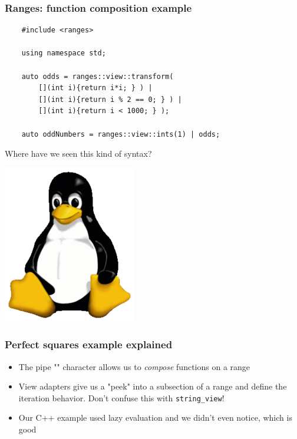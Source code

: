 \documentclass{beamer}
\begin{document}
\begin{frame}[fragile] %
\frametitle{Ranges: function composition example}

\vspace{3em}

\begin{lstlisting}
    #include <ranges>
    
    using namespace std;    
    
    auto odds = ranges::view::transform(
     	[](int i){return i*i; } ) |
     	[](int i){return i % 2 == 0; } ) |
     	[](int i){return i < 1000; } );
    									
    auto oddNumbers = ranges::view::ints(1) | odds;
\end{lstlisting}

\vspace{1em}

Where have we seen this kind of syntax?

\hspace{10em}  \includegraphics[scale=0.2]{tux.png}
\end{frame}


\begin{frame}
\frametitle{Perfect squares example explained}
\begin{itemize}
 \setlength\itemsep{2em}
\item The pipe "\textbar " character allows us to \emph{compose} functions on a range
\item View adapters give us a "peek" into a subsection of a range and define the iteration behavior. Don't confuse this with \texttt{string\_view}!
\item Our C++ example used lazy evaluation and we didn't even notice, which is good
\end{itemize}
\end{frame}
\end{document}
